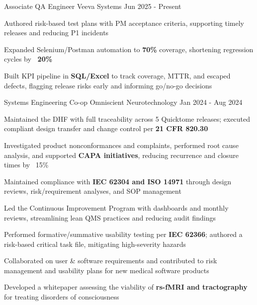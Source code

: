 \documentclass[11pt, a4paper]{russell}
\begin{document}
\begin{cventries}
\cventry
  {Associate QA Engineer} %
  {Veeva Systems} %
  {} %
  {Jun 2025 - Present} %
  {
    \begin{cvitems}
        \item {Authored risk-based test plans with PM acceptance criteria, supporting timely releases and reducing P1 incidents}
        \item {Expanded Selenium/Postman automation to \textbf{70\%} coverage, shortening regression cycles by \textbf{~20\%}}
        \item {Built KPI pipeline in \textbf{SQL/Excel} to track coverage, MTTR, and escaped defects, flagging release risks early and informing go/no-go decisions}
    \end{cvitems}
  }

\cventry
  {Systems Engineering Co-op} %
  {Omniscient Neurotechnology} %
  {} %
  {Jan 2024 - Aug 2024} %
  {
    \begin{cvitems}
        \item {Maintained the DHF with full traceability across 5 Quicktome releases; executed compliant design transfer and change control per \textbf{21 CFR 820.30}}
        \item {Investigated product nonconformances and complaints, performed root cause analysis, and supported \textbf{CAPA initiatives}, reducing recurrence and closure times by ~15\%}
        \item {Maintained compliance with \textbf{IEC 62304 and ISO 14971} through design reviews, risk/requirement analyses, and SOP management}
        \item {Led the Continuous Improvement Program with dashboards and monthly reviews, streamlining lean QMS practices and reducing audit findings}
        \item {Performed formative/summative usability testing per \textbf{IEC 62366}; authored a risk-based critical task file, mitigating high-severity hazards}
        \item {Collaborated on user \& software requirements and contributed to risk management and usability plans for new medical software products}
        \item {Developed a whitepaper assessing the viability of \textbf{rs-fMRI and tractography} for treating disorders of consciousness}
    \end{cvitems}
  }


\end{cventries}
\end{document}
